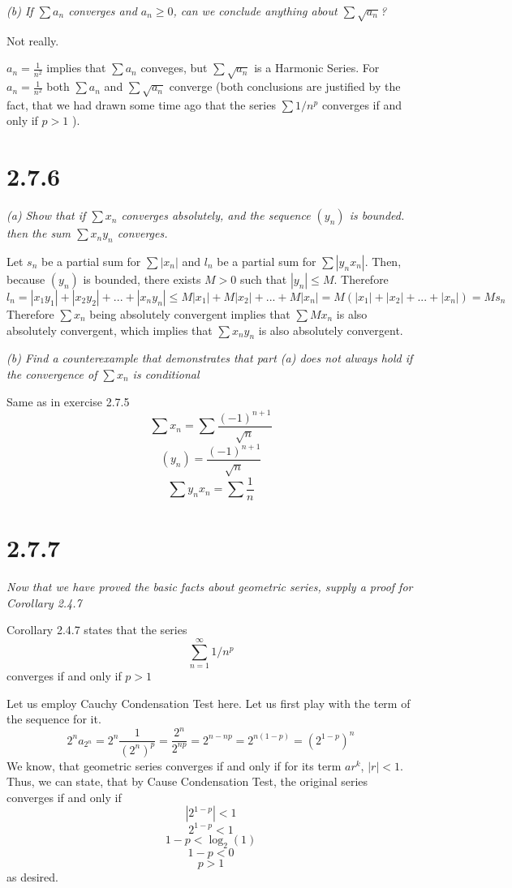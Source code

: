 \documentclass[11pt,oneside,titlepage]{book}
\begin{document}
\textit{(b) If $\sum a_n$ converges and $a_n \geq 0$, can we conclude anything
  about $\sum \sqrt{a_n}$?}

Not really.

$a_n = \frac{1}{n^2}$ implies that  $\sum a_n $ conveges, but $\sum \sqrt{a_n}$
is a Harmonic Series. For $a_n = \frac{1}{n^2}$ both $\sum a_n$ and
$\sum \sqrt{a_n}$ converge (both conclusions are justified by the fact, that
we had drawn  some time ago that the series
$\sum 1/n^p$ converges if and only if $p > 1$ ).

\section*{2.7.6}
\textit{(a) Show that if $\sum x_n$ converges absolutely, and the sequence
$(y_n)$ is bounded. then the sum $\sum x_n y_n$ converges.}


Let $s_n$ be a partial sum for $\sum |x_n|$ and $l_n$ be a partial sum
for $\sum |y_n x_n|$. Then, because $(y_n)$
is bounded, there exists $M > 0$ such that $|y_n| \leq M$.  Therefore
$$l_n = |x_1 y_1| + |x_2 y_2| + ... + |x_n y_n| \leq M|x_1| + M|x_2| + ... +
M|x_n| = M(|x_1| + |x_2| + ... + |x_n|) = Ms_n$$
Therefore $\sum x_n$  being absolutely  convergent implies that
$\sum M x_n$ is also absolutely convergent, which implies that $\sum x_n y_n$
is also absolutely convergent.

\textit{(b) Find a counterexample that demonstrates that part (a) does not
  always hold if the convergence of $\sum x_n$ is conditional}

Same as in exercise 2.7.5
$$\sum x_n = \sum \frac{(-1)^{n + 1}}{\sqrt{n}}$$
$$(y_n) = \frac{(-1)^{n + 1}}{\sqrt{n}}$$
$$\sum y_n x_n = \sum \frac{1}{n}$$

\section*{2.7.7}
\textit{Now that we have proved the basic facts about geometric series,
  supply a proof for Corollary 2.4.7}

Corollary 2.4.7 states that the series
$$\sum^{\infty}_{n = 1} 1/n^p$$
converges if and only if $p > 1$



Let us employ Cauchy Condensation Test here.
Let us first play with the term of the sequence for it.
$$2^n a_{2^n} = 2^n \frac{1}{(2^n)^p} = \frac{2^n}{2^{np}} =
2^{n - np} = 2^{n(1 - p)} = (2^{1 - p})^n$$
We know, that geometric series converges if and only if
for its term $ar^k$,  $|r| < 1$. Thus, we
can state, that by Cause Condensation Test, the original series converges
if and only if 
$$|2^{1 - p}| < 1$$
$$2^{1 - p} < 1$$
$$1 - p < \log_2 (1)$$
$$1 - p < 0$$
$$p > 1$$
as desired.
\end{document}
